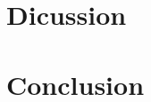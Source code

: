 \documentclass[10pt, a4paper, twocolumn]{article} %
\begin{document}
\section{Dicussion}
\section{Conclusion}

\printbibliography[title={Bibliography}] %

\end{document}
